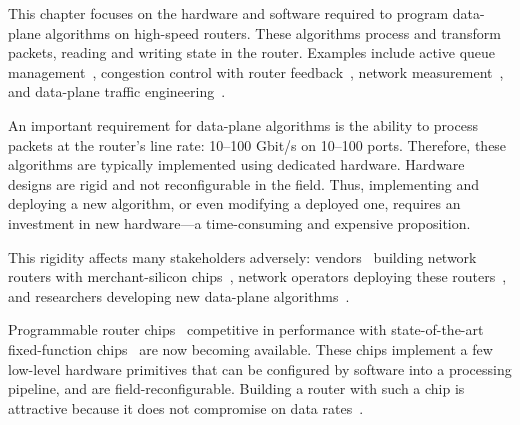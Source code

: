
This chapter focuses on the hardware and software required to program
data-plane algorithms on high-speed routers. These algorithms process and
transform packets, reading and writing state in the router. Examples include
active queue management~\cite{red,avq,codel}, congestion control with router
feedback~\cite{xcp, rcp}, network measurement~\cite{opensketch, bitmap_george},
and data-plane traffic engineering~\cite{conga}.

An important requirement for data-plane algorithms is the ability to process
packets at the router's line rate: 10--100 Gbit/s on 10--100 ports.  Therefore,
these algorithms are typically implemented using dedicated hardware.  Hardware
designs are rigid and not reconfigurable in the field. Thus, implementing and
deploying a new algorithm, or even modifying a deployed one, requires an
investment in new hardware---a time-consuming and expensive proposition.

This rigidity affects many stakeholders adversely: vendors~\cite{arista_7050,
cisco_nexus, dell_force10} building network routers with merchant-silicon
chips~\cite{trident, tomahawk, mellanox}, network operators deploying these
routers~\cite{vl2, facebook, google}, and researchers developing new data-plane
algorithms~\cite{conga, bitmap_george, xcp, rcp}.


Programmable router chips~\cite{tofino, flexpipe, xpliant} competitive in
performance with state-of-the-art fixed-function chips~\cite{trident, tomahawk,
mellanox} are now becoming available. These chips implement a few low-level
hardware primitives that can be configured by software into a processing
pipeline, and are field-reconfigurable. Building a router with such a chip is
attractive because it does not compromise on data rates~\cite{rmt}.

